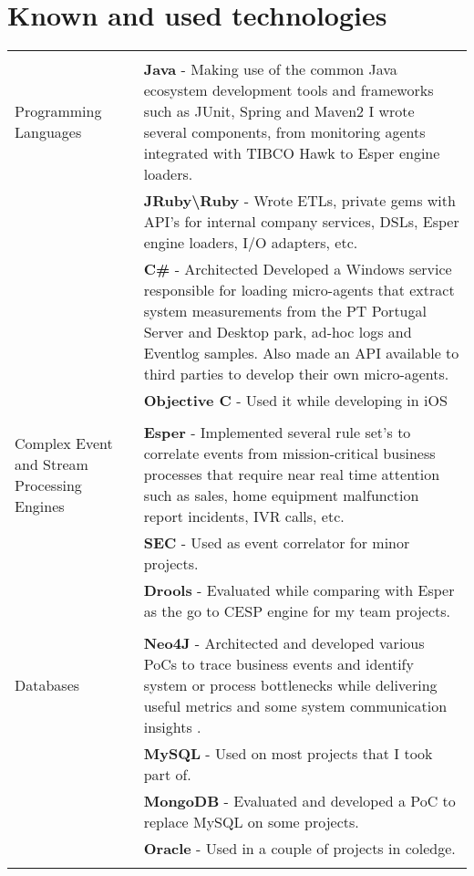 \documentclass[a4paper,10pt]{article}
\begin{document}
\section{Known and used technologies}
\begin{tabular}{p{4cm}|p{9cm}}
\multicolumn{2}{c}{} \\
	Programming Languages
	& {\bf Java} - Making use of the common Java ecosystem development tools and frameworks such as JUnit, Spring and Maven2 I wrote several components, from monitoring agents
	 integrated with TIBCO Hawk to Esper engine loaders.  \\
	& {\bf JRuby\textbackslash Ruby} - Wrote ETLs, private gems with API's for internal company services, DSLs, Esper engine loaders, I/O adapters, etc.\\
	& {\bf C\# } - Architected Developed a Windows service responsible for loading micro-agents that extract system measurements from the PT Portugal Server and Desktop park, ad-hoc logs and Eventlog samples.
	Also made an API available to third parties to develop their own micro-agents.\\
	& {\bf Objective C} - Used it while developing in iOS\\
\multicolumn{2}{c}{} \\
	Complex Event and Stream Processing Engines
	& {\bf Esper} - Implemented several rule set's to correlate events from mission-critical business processes that require near real time attention such as sales, home equipment malfunction report incidents, IVR calls, etc.\\
	& {\bf SEC} - Used as event correlator for minor projects. \\
	& {\bf Drools} - Evaluated while comparing with Esper as the go to CESP engine for my team projects. \\
\multicolumn{2}{c}{} \\
	Databases
	& {\bf Neo4J} - Architected and developed various PoCs to trace business events and identify system or process bottlenecks while delivering useful metrics and some system communication insights .\\ 
	& {\bf MySQL} - Used on most projects that I took part of. \\
	& {\bf MongoDB} - Evaluated and developed a PoC to replace MySQL on some projects. \\
	& {\bf Oracle} - Used in a couple of projects in coledge.\\
\multicolumn{2}{c}{} \\

\end{tabular}
\end{document}
